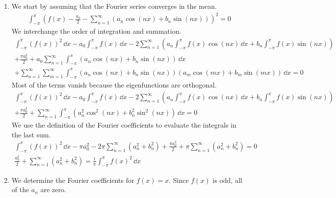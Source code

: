 {\begin{Solution}
  \begin{enumerate}
  \item 
    We start by assuming that the Fourier series converges in the mean.
    \begin{gather*}
      \int_{-\pi}^\pi \left( f(x) - \frac{a_0}{2} 
        - \sum_{n=1}^\infty (a_n \cos(n x) + b_n \sin(n x)) \right)^2 = 0
    \end{gather*}
    We interchange the order of integration and summation.
    \begin{multline*}
      \int_{-\pi}^\pi (f(x))^2 \,\dd x  - a_0 \int_{-\pi}^\pi f(x)\,\dd x
      - 2 \sum_{n=1}^\infty \left( a_n \int_{-\pi}^\pi f(x) \cos(n x)\,\dd x 
        + b_n \int_{-\pi}^\pi f(x) \sin(n x) \right) 
      \\
      + \frac{\pi a_0^2}{2}
      + a_0 \sum_{n=1}^\infty \int_{-\pi}^\pi (a_n \cos(n x) + b_n \sin(n x))\,\dd x
      \\
      + \sum_{n=1}^\infty \sum_{m=1}^\infty \int_{-\pi}^\pi (a_n \cos(n x) + b_n \sin(n x))
      (a_m \cos(m x) + b_m \sin(m x))\,\dd x = 0
    \end{multline*}
    Most of the terms vanish because the eigenfunctions are orthogonal.
    \begin{multline*}
      \int_{-\pi}^\pi (f(x))^2 \,\dd x  - a_0 \int_{-\pi}^\pi f(x)\,\dd x
      - 2 \sum_{n=1}^\infty \left( a_n \int_{-\pi}^\pi f(x) \cos(n x)\,\dd x 
        + b_n \int_{-\pi}^\pi f(x) \sin(n x) \right) 
      \\
      + \frac{\pi a_0^2}{2}
      + \sum_{n=1}^\infty \int_{-\pi}^\pi (a_n^2 \cos^2(n x) + b_n^2 \sin^2(n x))\,\dd x = 0
    \end{multline*}
    We use the definition of the Fourier coefficients to evaluate the integrals 
    in the last sum.
    \begin{gather*}
      \int_{-\pi}^\pi (f(x))^2 \,\dd x  - \pi a_0^2
      - 2 \pi \sum_{n=1}^\infty \left( a_n^2 + b_n^2 \right) 
      + \frac{\pi a_0^2}{2}
      + \pi \sum_{n=1}^\infty \left( a_n^2 + b_n^2 \right) = 0
      \\
      \boxed{
        \frac{a_0^2}{2} + \sum_{n=1}^{\infty} \left( a_n^2 +b_n^2 \right) 
        = \frac{1}{\pi} \int_{-\pi}^{\pi} f(x)^2 \,\dd x
        }
    \end{gather*}
  \item 
    We determine the Fourier coefficients for $f(x) = x$.  Since $f(x)$ is 
    odd, all of the $a_n$ are zero.
    \begin{align*}

\end{align*}
\end{enumerate}
\end{Solution}}
